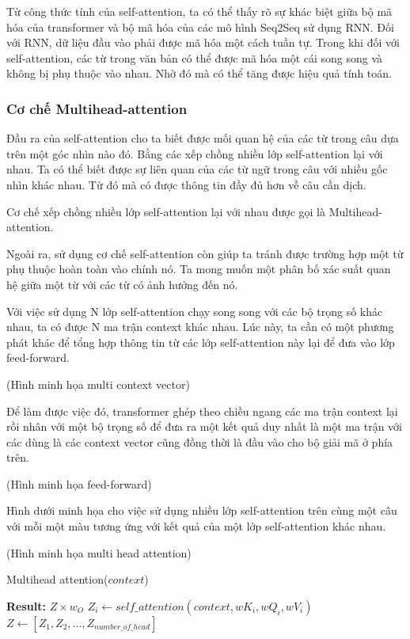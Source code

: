 Từ công thức tính của self-attention, ta có thể thấy rõ sự khác biệt giữa bộ mã hóa của transformer và bộ mã hóa của các mô hình Seq2Seq sử dụng RNN. Đối với RNN, dữ liệu đầu vào phải được mã hóa một cách tuần tự. Trong khi đối với self-attention, các từ trong văn bản có thể được mã hóa một cái song song và không bị phụ thuộc vào nhau. Nhờ đó mà có thể tăng được hiệu quả tính toán.

\subsubsection{Cơ chế Multihead-attention}
Đầu ra của self-attention cho ta biết được mối quan hệ của các từ trong câu dựa trên một góc nhìn nào đó. Bằng các xếp chồng nhiều lớp self-attention lại với nhau. Ta có thể biết được sự liên quan của các từ ngữ trong câu với nhiều gốc nhìn khác nhau. Từ đó mà có được thông tin đầy đủ hơn về câu cần dịch. 

Cơ chế xếp chồng nhiều lớp self-attention lại với nhau được gọi là Multihead-attention. 

Ngoài ra, sử dụng cơ chế self-attention còn giúp ta tránh được trường hợp một từ phụ thuộc hoàn toàn vào chính nó. Ta mong muốn một phân bố xác suất quan hệ giữa một từ với các từ có ảnh hưởng đến nó.

Với việc sử dụng N lớp self-attention chạy song song với các bộ trọng số khác nhau, ta có được N ma trận context khác nhau. Lúc này, ta cần có một phương phát khác để tổng hợp thông tin từ các lớp self-attention này lại để đưa vào lớp feed-forward. 

(Hình minh họa multi context vector)

Để làm được việc đó, transformer ghép theo chiều ngang các ma trận context lại rồi nhân với một bộ trọng số để đưa ra một kết quả duy nhất là một ma trận với các dùng là các context vector cũng đồng thời là đầu vào cho bộ giải mã ở phía trên.

(Hình minh họa feed-forward)

Hình dưới minh họa cho việc sử dụng nhiều lớp self-attention trên cùng một câu với mỗi một màu tương ứng với kết quả của một lớp self-attention khác nhau.

(Hình minh họa multi head attention)

\begin{algorithm}[H]
    \caption{Multihead attention($context$)}
    \begin{algorithmic}[1]
		\State \textbf{Result:} $Z \times w_O$
			\State $Z_i \gets self\_attention(context, wK_i, wQ_i, wV_i)$
		\EndFor
		\State $Z \gets [Z_1, Z_2,... ,Z_{number\_of\_head}]$
    \end{algorithmic}
\end{algorithm}


